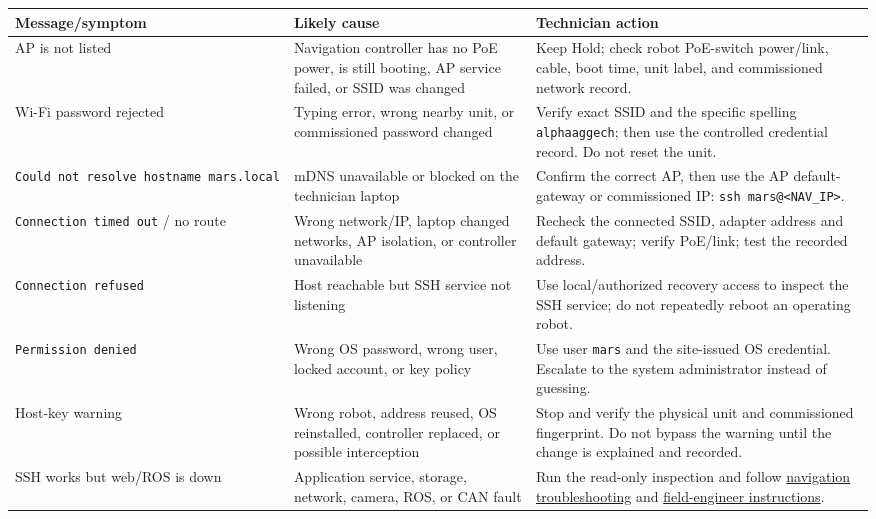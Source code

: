 \documentclass[
  10pt,
  letterpaper,
  openany]{report}
\newcounter{none} %
\begin{document}
{\def\LTcaptype{none} %
\begin{longtable}[]{@{}
  >{\raggedright\arraybackslash}p{}
  >{\raggedright\arraybackslash}p{}
  >{\raggedright\arraybackslash}p{}@{}}
\toprule\noalign{}
\begin{minipage}[b]{\linewidth}\raggedright
Message/symptom
\end{minipage} & \begin{minipage}[b]{\linewidth}\raggedright
Likely cause
\end{minipage} & \begin{minipage}[b]{\linewidth}\raggedright
Technician action
\end{minipage} \\
\midrule\noalign{}
\endhead
\bottomrule\noalign{}
\endlastfoot
AP is not listed & Navigation controller has no PoE power, is still
booting, AP service failed, or SSID was changed & Keep Hold; check robot
PoE-switch power/link, cable, boot time, unit label, and commissioned
network record. \\
Wi-Fi password rejected & Typing error, wrong nearby unit, or
commissioned password changed & Verify exact SSID and the specific
spelling \texttt{alphaaggech}; then use the controlled credential
record. Do not reset the unit. \\
\texttt{Could\ not\ resolve\ hostname\ mars.local} & mDNS unavailable or
blocked on the technician laptop & Confirm the correct AP, then use the
AP default-gateway or commissioned IP:
\texttt{ssh\ mars@\textless{}NAV\_IP\textgreater{}}. \\
\texttt{Connection\ timed\ out} / no route & Wrong network/IP, laptop
changed networks, AP isolation, or controller unavailable & Recheck the
connected SSID, adapter address and default gateway; verify PoE/link;
test the recorded address. \\
\texttt{Connection\ refused} & Host reachable but SSH service not
listening & Use local/authorized recovery access to inspect the SSH
service; do not repeatedly reboot an operating robot. \\
\texttt{Permission\ denied} & Wrong OS password, wrong user, locked
account, or key policy & Use user \texttt{mars} and the site-issued OS
credential. Escalate to the system administrator instead of guessing. \\
Host-key warning & Wrong robot, address reused, OS reinstalled,
controller replaced, or possible interception & Stop and verify the
physical unit and commissioned fingerprint. Do not bypass the warning
until the change is explained and recorded. \\
SSH works but web/ROS is down & Application service, storage, network,
camera, ROS, or CAN fault & Run the read-only inspection and follow
\hyperref[nav-trouble]{navigation troubleshooting} and
\hyperref[nav-engineer]{field-engineer instructions}. \\
\end{longtable}
}
\end{document}
